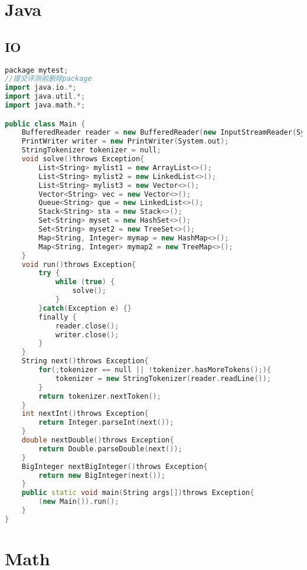 \section{Java}
\subsection{IO}
\begin{lstlisting}[language=C++]
package mytest;
//提交评测前删除package
import java.io.*;
import java.util.*;
import java.math.*;

public class Main {
    BufferedReader reader = new BufferedReader(new InputStreamReader(System.in));
    PrintWriter writer = new PrintWriter(System.out);
    StringTokenizer tokenizer = null;
    void solve()throws Exception{
    	List<String> mylist1 = new ArrayList<>();
		List<String> mylist2 = new LinkedList<>();
		List<String> mylist3 = new Vector<>();
		Vector<String> vec = new Vector<>();
		Queue<String> que = new LinkedList<>();
		Stack<String> sta = new Stack<>();
		Set<String> myset = new HashSet<>();
		Set<String> myset2 = new TreeSet<>();
		Map<String, Integer> mymap = new HashMap<>();
		Map<String, Integer> mymap2 = new TreeMap<>();
    }
    void run()throws Exception{
    	try {
    		while (true) {
    			solve();
    		}
    	}catch(Exception e) {}
    	finally {
    		reader.close();
    		writer.close();
    	}
    }
    String next()throws Exception{ 
    	for(;tokenizer == null || !tokenizer.hasMoreTokens();){
    		tokenizer = new StringTokenizer(reader.readLine());
    	}
    	return tokenizer.nextToken();
    }
    int nextInt()throws Exception{
    	return Integer.parseInt(next());
    }
    double nextDouble()throws Exception{
    	return Double.parseDouble(next());
    }
    BigInteger nextBigInteger()throws Exception{
    	return new BigInteger(next());
    }
    public static void main(String args[])throws Exception{
    	(new Main()).run();
    }
}
\end{lstlisting}

\section{Math}
